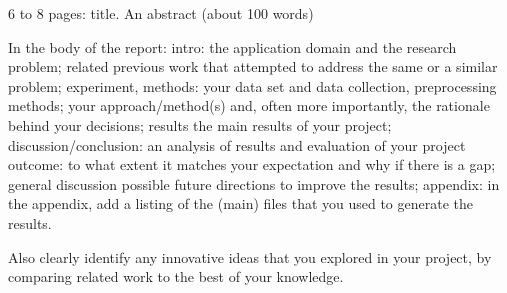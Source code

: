 \documentclass[%
 reprint,
 amsmath,amssymb,
 aps,
]{revtex4-1}
\begin{document}

\title{}

\author{Loes Erven (s4538757)}
\author{Leander van den Heuvel (s...)}


\date{\today}%

\begin{abstract}   
\end{abstract}

6 to 8 pages:
 title.
 An abstract (about 100 words) 
 
In the body of the report:
	intro:
		the application domain and the research problem;
		related previous work that attempted to address the same or a similar problem;
    experiment, methods:
		your data set and data collection, preprocessing methods;
		your approach/method(s) and, often more importantly, the rationale behind your decisions;
    results
    	the main results of your project;
    discussion/conclusion:
		an analysis of results and evaluation of your project outcome: to what extent it matches your expectation and why if there is a gap;
	general discussion
		possible future directions to improve the results;
	appendix:
		in the appendix, add a listing of the (main) files that you used to generate the results.
        
Also clearly identify any innovative ideas that you explored in your project, by comparing related work to the best of your knowledge.


\maketitle


\section{}
\end{document}
